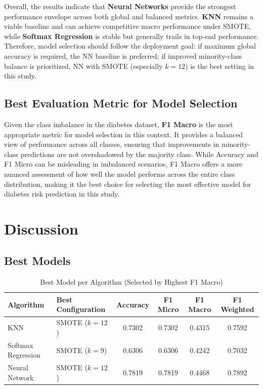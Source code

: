 \documentclass[12pt,a4paper]{report}
\begin{document}
Overall, the results indicate that \textbf{Neural Networks} provide the strongest performance envelope across both global and balanced metrics. \textbf{KNN} remains a viable baseline and can achieve competitive macro performance under SMOTE, while \textbf{Softmax Regression} is stable but generally trails in top-end performance. Therefore, model selection should follow the deployment goal: if maximum global accuracy is required, the NN baseline is preferred; if improved minority-class balance is prioritized, NN with SMOTE (especially $k=12$) is the best setting in this study.

\section{Best Evaluation Metric for Model Selection}
Given the class imbalance in the diabetes dataset, \textbf{F1 Macro} is the most appropriate metric for model selection in this context. It provides a balanced view of performance across all classes, ensuring that improvements in minority-class predictions are not overshadowed by the majority class. While Accuracy and F1 Micro can be misleading in imbalanced scenarios, F1 Macro offers a more nuanced assessment of how well the model performs across the entire class distribution, making it the best choice for selecting the most effective model for diabetes risk prediction in this study.



\newpage
\chapter{Discussion}
\section{Best Models}

\begin{table}[H]
    \centering
    \caption{Best Model per Algorithm (Selected by Highest F1 Macro)}
    \label{tab:best-model-per-algorithm}
    \begin{tabular}{llcccc}
        \toprule
        \textbf{Algorithm} & \textbf{Best Configuration} & \textbf{Accuracy} & \textbf{F1 Micro} & \textbf{F1 Macro} & \textbf{F1 Weighted} \\
        \midrule
        KNN & SMOTE ($k=12$) & 0.7302 & 0.7302 & 0.4315 & 0.7592 \\
        Softmax Regression & SMOTE ($k=9$) & 0.6306 & 0.6306 & 0.4242 & 0.7032 \\
        Neural Network & SMOTE ($k=12$) & 0.7819 & 0.7819 & 0.4468 & 0.7892 \\
        \bottomrule
    \end{tabular}
\end{table}
\end{document}
